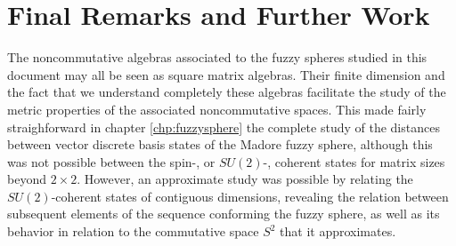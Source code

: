 \documentclass[12pt]{report}
\theoremstyle{definition}
\begin{document}
% 

\chapter{Final Remarks and Further Work}
 \label{chp:remarks}

The noncommutative algebras associated to the fuzzy spheres studied in this document may all be seen as square matrix algebras. Their finite dimension and the fact that we understand completely these algebras facilitate the study of the metric properties of the associated noncommutative spaces. This made fairly straighforward in chapter \ref{chp:fuzzysphere} the complete study of the distances between vector discrete basis states of the Madore fuzzy sphere, although this was not possible between the spin-, or $SU(2)$-, coherent states for matrix sizes beyond $2 \times 2$. However, an approximate study was possible by relating the $SU(2)$-coherent states of contiguous dimensions, revealing the relation between subsequent elements of the sequence conforming the fuzzy sphere, as well as its behavior in relation to the commutative space $S^2$ that it approximates. 
\end{document}
